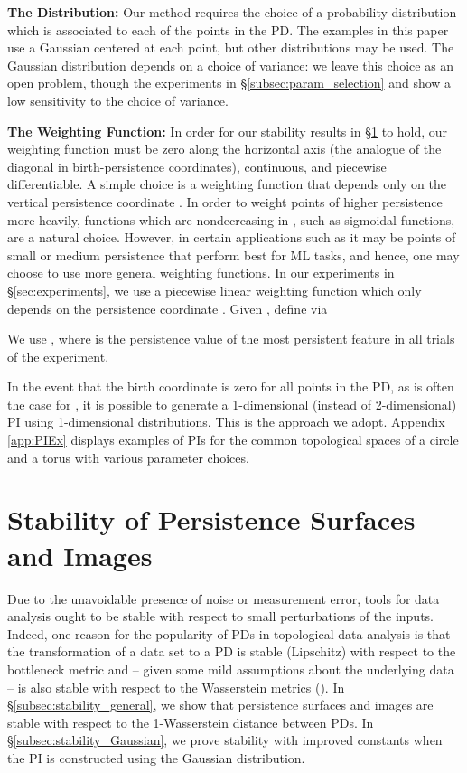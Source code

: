 \documentclass[11pt]{article}
\begin{document}
\textbf{The Distribution:}
Our method requires the choice of a probability distribution which is associated to each of the points in the PD. The examples in this paper use a Gaussian centered at each point, but other distributions may be used. The Gaussian distribution depends on a choice of variance: we leave this choice as an open problem, though the experiments in \S\ref{subsec:param_selection} and \citep{zeppelzauer2016topological} show a low sensitivity to the choice of variance.

\textbf{The Weighting Function:} In order for our stability results in \S\ref{sec:stability} to hold, our weighting function  must be zero along the horizontal axis (the analogue of the diagonal in birth-persistence coordinates), continuous, and piecewise differentiable. A simple choice is a weighting function that depends only on the vertical persistence coordinate . In order to weight points of higher persistence more heavily, functions which are nondecreasing in , such as sigmoidal functions, are a natural choice. However, in certain applications such as \citet{bendich2014persistent} it may be points of small or medium persistence that perform best for ML tasks, and hence, one may choose to use more general weighting functions. In our experiments in \S\ref{sec:experiments}, we use a piecewise linear weighting function  which only depends on the persistence coordinate . Given , define  via

We use , where  is the persistence value of the most persistent feature in all trials of the experiment. 

In the event that the birth coordinate is zero for all points in the PD, as is often the case for , it is possible to generate a 1-dimensional (instead of 2-dimensional) PI using 1-dimensional distributions. This is the approach we adopt. Appendix \ref{app:PIEx} displays examples of PIs for the common topological spaces of a circle and a torus with various parameter choices.

\section{Stability of Persistence Surfaces and Images}\label{sec:stability}

Due to the unavoidable presence of noise or measurement error, tools for data analysis ought to be stable with respect to small perturbations of the inputs. Indeed, one reason for the popularity of PDs in topological data analysis is that the transformation of a data set to a PD is stable (Lipschitz) with respect to the bottleneck metric and -- given some mild assumptions about the underlying data -- is also stable with respect to the Wasserstein metrics (\cite{Edelsbrunner10}). In \S\ref{subsec:stability_general}, we show that persistence surfaces and images are stable with respect to the 1-Wasserstein distance between PDs. In \S\ref{subsec:stability_Gaussian}, we prove stability with improved constants when the PI is constructed using the Gaussian distribution.
\end{document}

